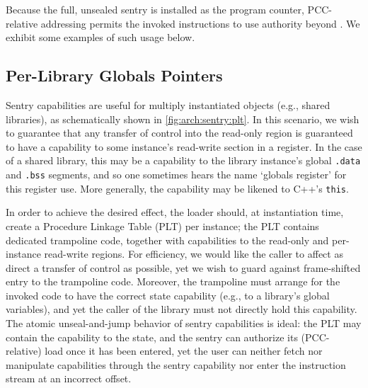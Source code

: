 Because the full, unsealed sentry is installed as the program counter,
PCC-relative addressing permits the invoked instructions to use authority
beyond \cappermX.  We exhibit some examples of such usage below.


\subsection{Per-Library Globals Pointers}

Sentry capabilities are useful for multiply instantiated objects (e.g., shared
libraries), as schematically shown in \cref{fig:arch:sentry:plt}.  In this
scenario, we wish to guarantee that any transfer of control into the read-only
region is guaranteed to have a capability to some instance's read-write section
in a register.  In the case of a shared library, this may be a capability to
the library instance's global \texttt{.data} and \texttt{.bss} segments, and so
one sometimes hears the name `globals register' for this register use.  More
generally, the capability may be likened to C++'s \texttt{this}.

In order to achieve the desired effect, the loader should, at instantiation
time, create a Procedure Linkage Table (PLT) per instance; the PLT contains
dedicated trampoline code, together with capabilities to the read-only and
per-instance read-write regions.  For efficiency, we would like the caller to
affect as direct a transfer of control as possible, yet we wish to guard
against frame-shifted entry to the trampoline code.  Moreover, the trampoline
must arrange for the invoked code to have the correct state capability (e.g.,
to a library's global variables), and yet the caller of the library must not
directly hold this capability.  The atomic unseal-and-jump behavior of sentry
capabilities is ideal: the PLT may contain the capability to the state, and the
sentry can authorize its (PCC-relative) load once it has been entered,
yet the user can neither fetch nor manipulate capabilities through the sentry
capability nor enter the instruction stream at an incorrect offset.

